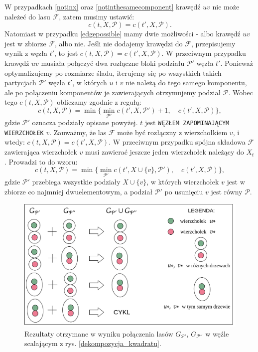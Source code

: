 \documentclass[12pt, oneside]{report}
\begin{document}
W przypadkach \ref{notinx} oraz \ref{notinthesamecomponent} krawędź $uv$ nie może należeć do lasu $\mathcal{F}$, zatem musimy ustawić: 
$$c(t, X, \mathcal{P}) = c(t', X, \mathcal{P}).$$
Natomiast w przypadku \ref{edgepossible} mamy dwie możliwości - albo krawędź $uv$ jest w zbiorze $\mathcal{F}$, albo nie. Jeśli nie dodajemy krawędzi do $\mathcal{F}$, przepisujemy wynik z węzła $t'$, to jest $c(t, X, \mathcal{P}) = c(t', X, \mathcal{P})$. W przeciwnym przypadku krawędź $uv$ musiała połączyć dwa rozłączne bloki podziału $\mathcal{P}'$ węzła $t'$. Ponieważ optymalizujemy po rozmiarze śladu, iterujemy się po wszystkich takich partycjach $\mathcal{P}'$ węzła $t'$, w których $u$ i $v$ nie należą do tego samego komponentu, ale po połączeniu komponentów je zawierających otrzymujemy podział $\mathcal{P}$. Wobec tego $c(t, X, \mathcal{P})$ obliczamy zgodnie z regułą:
$$c(t, X, \mathcal{P}) = \min \big\{ \min\limits_{\mathcal{P}'} c(t', X, \mathcal{P}') + 1, \quad c(t', X, \mathcal{P}) \big\},$$ gdzie $\mathcal{P'}$ oznacza podziały opisane powyżej.
\newline\newline
$t$ jest \texttt{WĘZŁEM ZAPOMINAJĄCYM WIERZCHOŁEK} $v$. Zauważmy, że las $\mathcal{F}$ może być rozłączny z wierzchołkiem $v$, i wtedy: $c(t, X, \mathcal{P}) = c(t', X, \mathcal{P})$.
W przeciwnym przypadku spójna składowa $\mathcal{F}$ zawierająca wierzchołek $v$ musi zawierać jeszcze jeden wierzchołek należący do $X_t$. Prowadzi to do wzoru:
$$c(t, X, \mathcal{P}) = \min \big\{ \min\limits_{\mathcal{P}'} c(t', X \cup \{v\}, \mathcal{P}'), \quad c(t', X, \mathcal{P}) \big\},$$ gdzie $\mathcal{P'}$ przebiega wszystkie podziały $X \cup \{v\}$, w których wierzchołek $v$ jest w zbiorze co najmniej dwuelementowym, a podział $\mathcal{P}'$ po usunięciu $v$ jest równy $\mathcal{P}$.

\begin{figure}
\centering
\includegraphics[width=16cm]{find_n_union.png}
\caption{Rezultaty otrzymane w wyniku połączenia lasów $G_{\mathcal{P}'}$, $G_{\mathcal{P}''}$ w węźle scalającym z rys. \ref{dekompozycja_kwadratu}.}
\label{find_n_union}
\end{figure}
\end{document}
